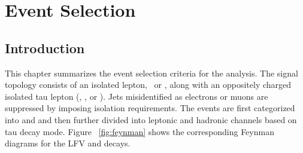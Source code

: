 %
%

\chapter{Event Selection}
\label{evt_sel}

\section{Introduction}
\label{evt_sel_intro}
This chapter summarizes the event selection criteria for the analysis. The signal topology consists of an isolated lepton, \Pgm\, or \Pe, along with an oppositely charged isolated tau lepton (\taum, \taue, or \tauh). Jets misidentified as electrons or muons are suppressed by imposing isolation requirements. The events are first categorized into \mutau and \etau and then further divided into leptonic and hadronic channels based on tau decay mode. Figure ~\ref{fig:feynman} shows the corresponding Feynman diagrams for the LFV \Hmt and \Het decays.

